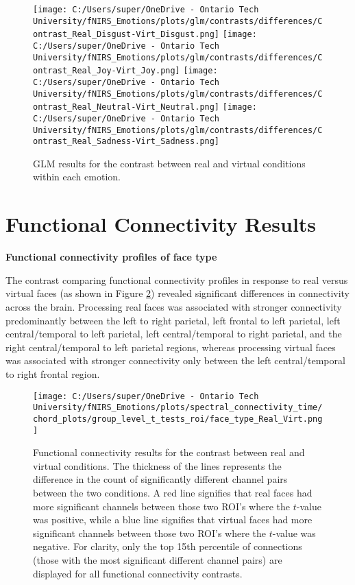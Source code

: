 \begin{figure}[H]
  \centering
  \texttt{[image: C:/Users/super/OneDrive - Ontario Tech University/fNIRS\_Emotions/plots/glm/contrasts/differences/Contrast\_Real\_Disgust-Virt\_Disgust.png]}
  \texttt{[image: C:/Users/super/OneDrive - Ontario Tech University/fNIRS\_Emotions/plots/glm/contrasts/differences/Contrast\_Real\_Joy-Virt\_Joy.png]}
  \texttt{[image: C:/Users/super/OneDrive - Ontario Tech University/fNIRS\_Emotions/plots/glm/contrasts/differences/Contrast\_Real\_Neutral-Virt\_Neutral.png]}
  \texttt{[image: C:/Users/super/OneDrive - Ontario Tech University/fNIRS\_Emotions/plots/glm/contrasts/differences/Contrast\_Real\_Sadness-Virt\_Sadness.png]}
  \caption[GLM: Face Type \texorpdfstring{$\times$}{x} Emotion Contrasts]{GLM results for the contrast between real and virtual conditions within each emotion.}
  \label{fig:glm_real_vs_virtual_emotion_analysis}
\end{figure}

\section{Functional Connectivity Results}
\noindent
\textbf{Functional connectivity profiles of face type}

The contrast comparing functional connectivity profiles in response to real versus virtual faces (as shown in Figure \ref{fig:fc_real_vs_virtual}) revealed significant differences in connectivity across the brain. 
Processing real faces was associated with stronger connectivity predominantly between the left to right parietal, left frontal to left parietal, left central/temporal to left parietal, left central/temporal to right parietal, and the right central/temporal to left parietal regions, whereas processing virtual faces was associated with stronger connectivity only between the left central/temporal to right frontal region. 

\begin{figure}[H]
  \centering
  \texttt{[image: C:/Users/super/OneDrive - Ontario Tech University/fNIRS\_Emotions/plots/spectral\_connectivity\_time/chord\_plots/group\_level\_t\_tests\_roi/face\_type\_Real\_Virt.png]}
  \caption[FC: Real vs. Virtual]{Functional connectivity results for the contrast between real and virtual conditions.
  The thickness of the lines represents the difference in the count of significantly different channel pairs between the two conditions. 
  A red line signifies that real faces had more significant channels between those two ROI's where the $t$-value was positive, while a blue line signifies that virtual faces had more significant channels between those two ROI's where the $t$-value was negative.
  For clarity, only the top 15th percentile of connections (those with the most significant different channel pairs) are displayed for all functional connectivity contrasts.}
  \label{fig:fc_real_vs_virtual}
\end{figure}

